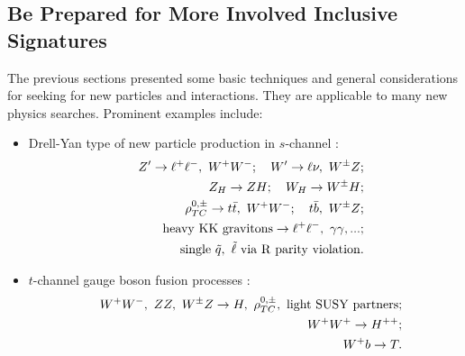\documentclass[prd,aps,floats,preprintnumbers,preprint,superscriptaddress,floatfix,nofootinbib]{revtex4}
\def\epem{e^+e^-}
\def\bea{\begin{eqnarray}}
\def\eea{\end{eqnarray}}
\begin{document}

\subsection{Be Prepared for More Involved Inclusive Signatures}
\label{more}

%
%
%
%

The previous sections presented some basic techniques and general
considerations for seeking for new particles and interactions. 
They are applicable to many new physics searches. 
 Prominent examples include:
\begin{itemize}
\item Drell-Yan type of new particle production in 
$s$-channel \cite{zprime,LH2,LH1,smoking,TC,RS,herbi2}:
\bea
\nonumber
&& Z' \to \ell^+\ell^-,\ W^+W^-;\quad W' \to \ell \nu,\ W^\pm Z; \\
\nonumber
&& Z_H \to ZH;\quad W_H \to W^\pm H;\\
\nonumber
&& \rho^{0,\pm}_{TC} \to t\bar t,\ W^+W^-;\quad t\bar b,\ W^\pm Z; \\
\nonumber
&& {\rm heavy\ KK\ gravitons}\to \ell^+\ell^-,\ \gamma\gamma, ... ;\\
&& {\rm single}\ \tilde q,\  \tilde\ell\ {\rm via\ R\ parity\ violation}.
\nonumber
\eea
\item $t$-channel gauge boson fusion processes \cite{WWSUSY,dicus,LH1,Mike,smoking}:
\bea
\nonumber
&& W^+W^-,\ ZZ,\ W^\pm Z \to H,\  \rho^{0,\pm}_{TC},\ {\rm light\ SUSY\   partners};\\ 
\nonumber
&& W^+W^+ \to H^{++};\\ 
&& W^+ b \to T.
\nonumber
\eea
\end{itemize}
\end{document}
